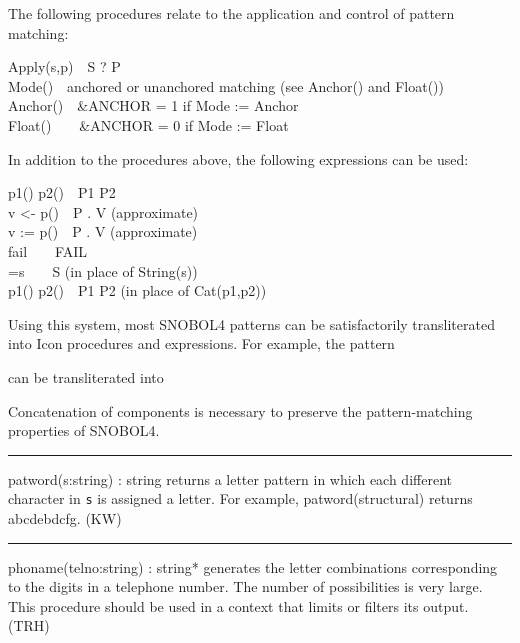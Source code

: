 The following procedures relate to the application and control of
pattern matching:

Apply(s,p)\ \ S ? P\\
Mode()\ \ anchored or unanchored matching (see Anchor() and
Float())\\
Anchor()\ \ \&ANCHOR = 1 if Mode := Anchor\\
Float()\ \ \ \ \&ANCHOR = 0 if Mode := Float

In addition to the procedures above, the following expressions can be
used:

p1() {\textbar} p2()\ \ P1 {\textbar} P2\\
v {\textless}- p()\ \ P . V (approximate)\\
v := p()\ \ P . V (approximate)\\
fail\ \ \ \ FAIL\\
=s\ \ \ \ S (in place of String(s))\\
p1() {\textbar}{\textbar} p2()\ \ P1 P2 (in place of Cat(p1,p2))

Using this system, most SNOBOL4 patterns can be satisfactorily
transliterated into Icon procedures and expressions. For example, the
pattern


can be transliterated into


Concatenation of components is necessary to preserve the
pattern-matching properties of SNOBOL4. 

\vspace{0.25cm}\hrule{}

\textsf{patword(s:string) : string} returns a letter pattern in which
each different character in \texttt{s} is assigned a letter. For
example, \textsf{patword({\textquotedbl}structural{\textquotedbl})}
returns \textsf{{\textquotedbl}abcdebdcfg{\textquotedbl}}. (KW)

\vspace{0.25cm}\hrule{}

\textsf{phoname(telno:string) : string*} generates the letter
combinations corresponding to the digits in a telephone number. The
number of possibilities is very large. This procedure should be used in
a context that limits or filters its output. (TRH)

